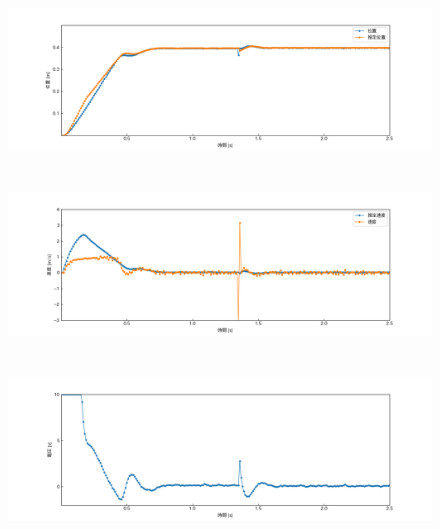 \documentclass[12pt]{jsarticle}
\begin{document}
\begin{figure}[H]
  \begin{center}
    \includegraphics[clip,width=13.0cm, height=4.4cm]{../img/Exp12-1.png}
    \caption{}
    \label{Exp12-1}
  \end{center}
\end{figure}
\begin{figure}[H]
  \begin{center}
    \includegraphics[clip,width=13.0cm, height=4.4cm]{../img/Exp12-2.png}
    \caption{}
    \label{Exp12-2}
  \end{center}
\end{figure}
\begin{figure}[H]
  \begin{center}
    \includegraphics[clip,width=13.0cm, height=4.4cm]{../img/Exp12-3.png}
    \caption{}
    \label{Exp12-3}
  \end{center}
\end{figure}
\end{document}
